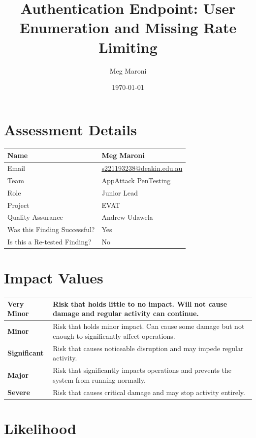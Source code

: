 \documentclass[12pt]{article}
\title{Authentication Endpoint: User Enumeration and Missing Rate Limiting}
\author{Meg Maroni}
\date{\today}
\begin{document}
\maketitle

\section*{Assessment Details}

\begin{tabular}{|p{5cm}|p{7.5cm}|}
\hline
Name & Meg Maroni \\ \hline
Email & \href{mailto:s221193238@deakin.edu.au}{s221193238@deakin.edu.au} \\ \hline
Team & AppAttack PenTesting \\ \hline
Role & Junior Lead \\ \hline
Project & EVAT \\ \hline
Quality Assurance &  Andrew Udawela\\ \hline
Was this Finding Successful? & Yes \\ \hline
Is this a Re-tested Finding? & No \\ \hline
\end{tabular}

\section*{Impact Values}

\begin{longtable}{|p{3cm}|p{12cm}|}
\hline
\textbf{\textcolor{veryminor}{Very Minor}} & Risk that holds little to no impact. Will not cause damage and regular activity can continue. \\ \hline
\textbf{\textcolor{minor}{Minor}} & \textcolor{minor}{Risk that holds minor impact. Can cause some damage but not enough to significantly affect operations.} \\ \hline
\textbf{\textcolor{significant}{Significant}} & Risk that causes noticeable disruption and may impede regular activity. \\ \hline
\textbf{\textcolor{major}{Major}} & Risk that significantly impacts operations and prevents the system from running normally. \\ \hline
\textbf{\textcolor{severe}{Severe}} & Risk that causes critical damage and may stop activity entirely. \\ \hline
\end{longtable}

\section*{Likelihood}
\end{document}

